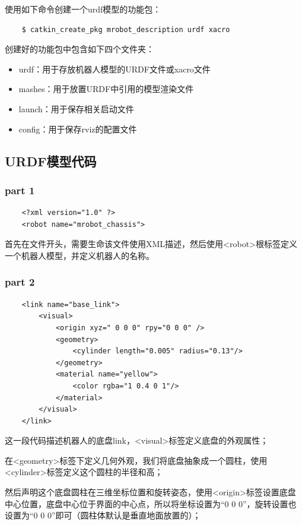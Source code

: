 \documentclass[9pt, oneside]{book}
\begin{document}
使用如下命令创建一个urdf模型的功能包：

\begin{verbatim}
    $ catkin_create_pkg mrobot_description urdf xacro
\end{verbatim}

创建好的功能包中包含如下四个文件夹：

\begin{itemize}
    \item urdf：用于存放机器人模型的URDF文件或xacro文件
    \item mashes：用于放置URDF中引用的模型渲染文件
    \item launch：用于保存相关启动文件
    \item config：用于保存rviz的配置文件
\end{itemize}

\subsection{URDF模型代码}

\subsubsection{part 1}

\begin{verbatim}
    <?xml version="1.0" ?>
    <robot name="mrobot_chassis">
\end{verbatim}

首先在文件开头，需要生命该文件使用XML描述，然后使用<robot>根标签定义一个机器人模型，并定义机器人的名称。

\subsubsection{part 2}
\begin{verbatim}
    <link name="base_link">
        <visual>
            <origin xyz=" 0 0 0" rpy="0 0 0" />
            <geometry>
                <cylinder length="0.005" radius="0.13"/>
            </geometry>
            <material name="yellow">
                <color rgba="1 0.4 0 1"/>
            </material>
        </visual>
    </link>
\end{verbatim}

这一段代码描述机器人的底盘link，<visual>标签定义底盘的外观属性；

在<geometry>标签下定义几何外观，我们将底盘抽象成一个圆柱，使用<cylinder>标签定义这个圆柱的半径和高；

然后声明这个底盘圆柱在三维坐标位置和旋转姿态，使用<origin>标签设置底盘中心位置，底盘中心位于界面的中心点，所以将坐标设置为“0 0 0”，旋转设置也设置为“0 0 0”即可（圆柱体默认是垂直地面放置的）；
\end{document}
